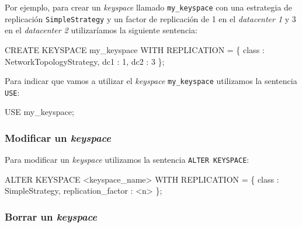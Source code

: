 \documentclass[
]{book}
\newenvironment{Shaded}{}{}
\newcommand{\NormalTok}[1]{#1}
\begin{document}
Por ejemplo, para crear un \emph{keyspace} llamado \texttt{my\_keyspace} con una estrategia de replicación \texttt{SimpleStrategy} y un factor de replicación de 1 en el \emph{datacenter 1} y 3 en el \emph{datacenter 2} utilizaríamos la siguiente sentencia:

\begin{Shaded}
\begin{Highlighting}[]
\NormalTok{CREATE KEYSPACE my\_keyspace}
\NormalTok{  WITH REPLICATION = \{ \textquotesingle{}class\textquotesingle{} : \textquotesingle{}NetworkTopologyStrategy\textquotesingle{}, \textquotesingle{}dc1\textquotesingle{} : 1, \textquotesingle{}dc2\textquotesingle{} : 3 \};}
\end{Highlighting}
\end{Shaded}

Para indicar que vamos a utilizar el \emph{keyspace} \texttt{my\_keyspace} utilizamos la sentencia \texttt{USE}:

\begin{Shaded}
\begin{Highlighting}[]
\NormalTok{USE my\_keyspace;}
\end{Highlighting}
\end{Shaded}

\subsubsection{\texorpdfstring{Modificar un \emph{keyspace}}{Modificar un keyspace}}\label{modificar-un-keyspace}

Para modificar un \emph{keyspace} utilizamos la sentencia \texttt{ALTER\ KEYSPACE}:

\begin{Shaded}
\begin{Highlighting}[]
\NormalTok{ALTER KEYSPACE \textless{}keyspace\_name\textgreater{}}
\NormalTok{  WITH REPLICATION = \{ \textquotesingle{}class\textquotesingle{} : \textquotesingle{}SimpleStrategy\textquotesingle{}, \textquotesingle{}replication\_factor\textquotesingle{} : \textless{}n\textgreater{} \};}
\end{Highlighting}
\end{Shaded}

\subsubsection{\texorpdfstring{Borrar un \emph{keyspace}}{Borrar un keyspace}}\label{borrar-un-keyspace}
\end{document}
